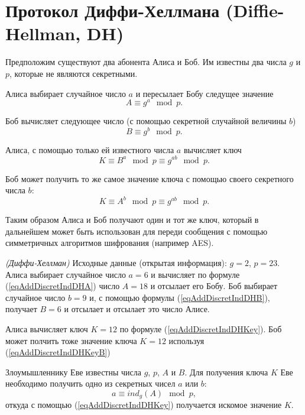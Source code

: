 \section{Протокол Диффи-Хеллмана (Diffie-Hellman, DH)}
Предположим существуют два абонента Алиса и Боб. Им известны два числа
$g$ и $p$, которые не являются секретными.

Алиса выбирает случайное число $a$ и пересылает Бобу следущее значение
\begin{equation}
A \equiv g^a \mod{p}.
\label{eqAddDiscretIndDHA}
\end{equation}

Боб вычисляет следующее число (с помощью секретной случайной величины
$b$)
\begin{equation}
B \equiv g^b \mod{p}.
\label{eqAddDiscretIndDHB}
\end{equation}

Алиса, с помощью только ей известного числа $a$ вычисляет ключ
\begin{equation}
K \equiv B^a\mod{p} \equiv g^{ab} \mod{p}.
\label{eqAddDiscretIndDHKey}
\end{equation}

Боб может получить то же самое значение ключа с помощью своего
секретного числа $b$:
\begin{equation}
K \equiv A^b\mod{p} \equiv g^{ab} \mod{p}.
\label{eqAddDiscretIndDHKeyB}
\end{equation}

Таким образом Алиса и Боб получают один и тот же ключ, который в
дальнейшем может быть использован для переди сообщения с помощью
симметричных алгоритмов шифрования (например AES).

\begin{example}
\emph{(Диффи-Хеллман)}
Исходные данные (открытая информация): $g = 2$, $p = 23$. Алиса
выбирает случайное число $a = 6$ и вычисляет по формуле
(\ref{eqAddDiscretIndDHA}) число 
$A = 18$ и отсылает его Бобу.
Боб выбирает случайное число $b=9$ и, с помощью формулы 
(\ref{eqAddDiscretIndDHB}), получает
$B = 6$ и отсылает и отсылает это число Алисе.

Алиса вычисляет ключ 
$K = 12$ по формуле (\ref{eqAddDiscretIndDHKey}). Боб может полчить
тоже значение ключа 
$K = 12$ используя (\ref{eqAddDiscretIndDHKeyB})
\nonumber
\end{example}

Злоумышленнику Еве известны числа $g$, $p$, $A$ и $B$. Для получения
ключа $K$ Еве необходимо получить одно из секретных чисел $a$ или $b$:
\begin{equation}
a \equiv ind_g\left( A \right) \mod{p},
\nonumber
\end{equation}
откуда с помощью (\ref{eqAddDiscretIndDHKey}) получается искомое
значение $K$.
